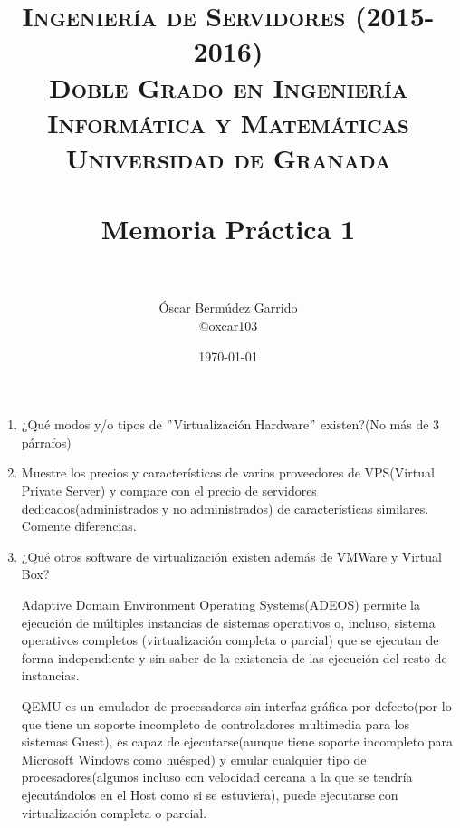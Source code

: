 \documentclass[paper=a4, fontsize=11pt]{scrartcl} %
\title{	
\normalfont \normalsize 
\textsc{{\bf Ingeniería de Servidores (2015-2016)} \\ Doble Grado en Ingeniería Informática y Matemáticas \\ Universidad de Granada} \\ [25pt] %
\horrule{0.5pt} \\[0.4cm] %
\huge Memoria Práctica 1 \\ %
\horrule{2pt} \\[0.5cm] %
}
\author{Óscar Bermúdez Garrido\\ \href{http://www.github.com/oxcar103}{@oxcar103}} %
\date{\normalsize\today} %
\numberwithin{equation}{section} %
\numberwithin{figure}{section} %
\numberwithin{table}{section} %
\begin{document}
\maketitle %

\newpage %

\tableofcontents %

\listoffigures

\listoftables

\newpage


\begin{enumerate}
	\section{Introducción}
	\subsection{Concepto de Máquina Virtual y virtualización}
		\item ¿Qué modos y/o tipos de $"$Virtualización Hardware$"$ existen?(No más de 3 párrafos)
		\cite{Virt}
		
		\item Muestre los precios y características de varios proveedores de VPS(Virtual Private
		Server) y compare con el precio de servidores dedicados(administrados y no administrados)
		de características similares. Comente diferencias.
		
		\item ¿Qué otros software de virtualización existen además de VMWare y Virtual Box?
		
		Adaptive Domain Environment Operating Systems(ADEOS\cite{Adeos}) permite la ejecución de
		múltiples instancias de sistemas operativos o, incluso, sistema operativos completos
		(virtualización completa o parcial) que se ejecutan de forma independiente y sin saber de
		la existencia de las ejecución del resto de instancias.
		
		QEMU\cite{QEMU} es un emulador de procesadores sin interfaz gráfica por defecto(por lo que
		tiene un soporte incompleto de controladores multimedia para los sistemas Guest), es capaz
		de ejecutarse(aunque tiene soporte incompleto para Microsoft Windows como huésped) y emular
		cualquier tipo de procesadores(algunos incluso con velocidad cercana a la que se tendría
		ejecutándolos en el Host como si se estuviera), puede ejecutarse con virtualización completa
		o parcial.
		

\end{enumerate}
\end{document}
